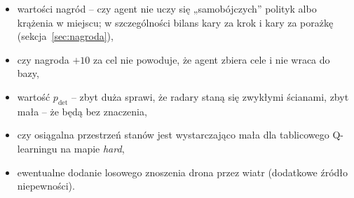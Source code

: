 \begin{itemize}
  \item wartości nagród -- czy agent nie uczy się „samobójczych'' polityk
        albo krążenia w miejscu; w szczególności bilans kary za krok i kary
        za porażkę (sekcja~\ref{sec:nagroda}),
  \item czy nagroda $+10$ za cel nie powoduje, że agent zbiera cele i nie
        wraca do bazy,
  \item wartość $p_{\text{det}}$ -- zbyt duża sprawi, że radary staną się
        zwykłymi ścianami, zbyt mała -- że będą bez znaczenia,
  \item czy osiągalna przestrzeń stanów jest wystarczająco mała dla
        tablicowego Q-learningu na mapie \emph{hard},
  \item ewentualne dodanie losowego znoszenia drona przez wiatr
        (dodatkowe źródło niepewności).
\end{itemize}
